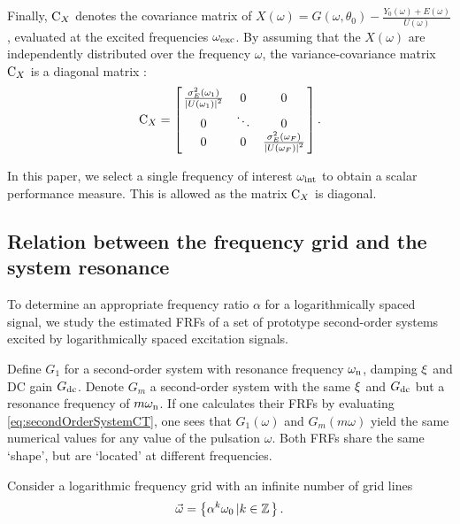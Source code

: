   Finally, $\mathrm{C}_{X}$ denotes the covariance matrix of $X\left(\omega\right) = G\left(\omega, \theta_0 \right) - \frac{Y_0\left(\omega \right) + E\left( \omega \right)  }{ U\left( \omega \right) } $, evaluated at the excited frequencies $\omega_{\mathrm{exc}}$.
  By assuming that the $X\left( \omega \right) $ are independently distributed over the frequency $\omega$, the variance-covariance matrix $\mathrm{C}_{X}$ is a diagonal matrix \citep{Pintelon2012}:
  \begin{equation}
    \mathrm{C}_{X} =
               \left[ \left.
               \begin{matrix}
                 \frac{\sigma^2_E\left(\omega_1 \right) }
                      {\left|  U\left(\omega_1 \right) \right|^2 } & 0 & 0 \\
                 0 & \ddots & 0 \\
                 0 & 0 & \frac{\sigma^2_E\left(\omega_F \right) }
                              {\left| U\left(\omega_F \right) \right|^2 }
               \end{matrix}
               \right.^{\vphantom{x}}\right]
    \text{.}
  \end{equation}

  In this paper, we select a single frequency of interest $\omega_{\mathrm{int}}$
  to obtain a scalar performance measure.
  This is allowed as the matrix $\mathrm{C}_{X}$ is diagonal.

  \subsection{Relation between the frequency grid and the system resonance} \label{sec:relationLogGridSystem}
  To determine an appropriate frequency ratio $\alpha$ for a logarithmically spaced signal, we study the estimated FRFs of a set of prototype second-order systems excited by logarithmically spaced excitation signals.

  Define $G_{1}$ for a second-order system with resonance frequency $\omega_{\mathrm{n}}$, damping $\xi$ and DC gain $G_{\mathrm{dc}}$.
  Denote $G_m$ a second-order system with the same $\xi$ and $G_{\mathrm{dc}}$ but a resonance frequency of $m\omega_{\mathrm{n}}$.
  If one calculates their FRFs by evaluating \eqref{eq:secondOrderSystemCT}, one sees that $G_1(\omega)$ and $G_m(m\omega)$ yield the same numerical values for any value of the pulsation $\omega$.
  Both FRFs share the same `shape', but are `located' at different frequencies.

  Consider a logarithmic frequency grid with an infinite number of grid lines
  \begin{equation}
    \vec{\omega} = \left\{\alpha^k \omega_0 \left| k \in \mathbb{Z} \right.\right\}
    \label{eq:freqGridLog}
    \text{.}
  \end{equation}

